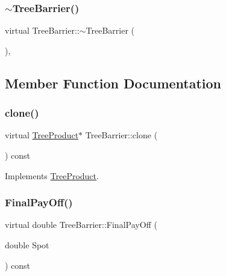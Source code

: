 \subsubsection{\texorpdfstring{$\sim$\+Tree\+Barrier()}{~TreeBarrier()}}
{\footnotesize\ttfamily virtual Tree\+Barrier\+::$\sim$\+Tree\+Barrier (\begin{DoxyParamCaption}{ }\end{DoxyParamCaption})\hspace{0.3cm}{\ttfamily [inline]}, {\ttfamily [virtual]}}



\subsection{Member Function Documentation}
\hypertarget{classTreeBarrier_a549dec4cf147800496f9efca623201f9}{}\label{classTreeBarrier_a549dec4cf147800496f9efca623201f9} 
\subsubsection{\texorpdfstring{clone()}{clone()}}
{\footnotesize\ttfamily virtual \hyperlink{classTreeProduct}{Tree\+Product}$\ast$ Tree\+Barrier\+::clone (\begin{DoxyParamCaption}{ }\end{DoxyParamCaption}) const\hspace{0.3cm}{\ttfamily [virtual]}}



Implements \hyperlink{classTreeProduct_a38edda2bee3c7203e94511df96a18c32}{Tree\+Product}.

\hypertarget{classTreeBarrier_a920dcdcf9a3b00f6a83c13fbe51b5b8a}{}\label{classTreeBarrier_a920dcdcf9a3b00f6a83c13fbe51b5b8a} 
\subsubsection{\texorpdfstring{Final\+Pay\+Off()}{FinalPayOff()}}
{\footnotesize\ttfamily virtual double Tree\+Barrier\+::\+Final\+Pay\+Off (\begin{DoxyParamCaption}\item[{double}]{Spot }\end{DoxyParamCaption}) const\hspace{0.3cm}{\ttfamily [virtual]}}



